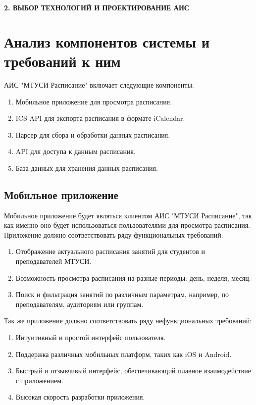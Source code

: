 \newpage
\begin{center}
  \textbf{\large 2. ВЫБОР ТЕХНОЛОГИЙ И ПРОЕКТИРОВАНИЕ АИС}
\end{center}


\section{Анализ компонентов системы и требований к ним}
АИС "МТУСИ Расписание" включает следующие компоненты: 
\begin{enumerate}
  \item Мобильное приложение для просмотра расписания.
  \item ICS API для экспорта расписания в формате iCalendar.
  \item Парсер для сбора и обработки данных расписания.
  \item API для доступа к данным расписания.
  \item База данных для хранения данных расписания.
\end{enumerate}


\subsection{Мобильное приложение}
Мобильное приложение будет являться клиентом АИС "МТУСИ Расписание", 
так как именно оно будет использоваться пользователями для просмотра расписания.
Приложение должно соответствовать ряду функциональных требований:
\begin{enumerate}
  \item Отображение актуального расписания занятий для студентов и преподавателей МТУСИ.
  \item Возможность просмотра расписания на разные периоды: день, неделя, месяц.
  \item Поиск и фильтрация занятий по различным параметрам, например, по преподавателям, аудиториям или группам.
\end{enumerate}

Так же приложение должно соответствовать ряду нефункциональных требований:
\begin{enumerate}
  \item Интуитивный и простой интерфейс пользователя.
  \item Поддержка различных мобильных платформ, таких как iOS и Android.
  \item Быстрый и отзывчивый интерфейс, обеспечивающий плавное взаимодействие с приложением.
  \item Высокая скорость разработки приложения.
\end{enumerate}


